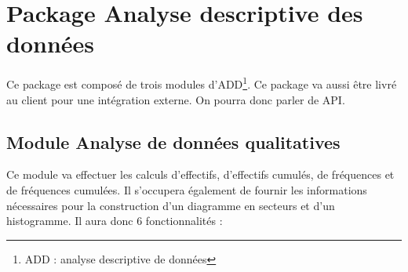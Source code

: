 	\section{Package Analyse descriptive des données}
	Ce package est composé de trois modules d'ADD\footnote{ADD : analyse descriptive de données}. Ce package va aussi être livré au client pour une intégration externe. On pourra donc parler de API.
	
		\subsection{Module Analyse de données qualitatives}
			Ce module va effectuer les calculs d'effectifs, d'effectifs cumulés, de fréquences et de fréquences cumulées. Il s'occupera également de fournir les informations nécessaires pour la construction d'un diagramme en secteurs et d'un histogramme. Il aura donc 6 fonctionnalités :
	

